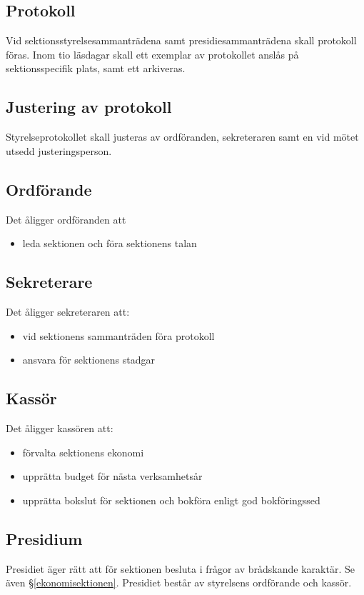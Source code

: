 \documentclass{datateknologsektionen-document}
\begin{document}
    \subsection{Protokoll}
      Vid sektionsstyrelsesammanträdena samt presidiesammanträdena skall protokoll föras.
      Inom tio läsdagar skall ett exemplar av protokollet anslås på sektionsspecifik plats, samt
      ett arkiveras.
    \subsection{Justering av protokoll}
      Styrelseprotokollet skall justeras av ordföranden, sekreteraren samt en vid mötet utsedd
      justeringsperson.
    \subsection{Ordförande}
      Det åligger ordföranden att
      \begin{itemize}
        \item leda sektionen och föra sektionens talan
      \end{itemize}
      
    \subsection{Sekreterare}
      Det åligger sekreteraren att:
      \begin{itemize}
        \item vid sektionens sammanträden föra protokoll
        \item ansvara för sektionens stadgar
      \end{itemize}
     
    \subsection{Kassör}
      Det åligger kassören att:
      \begin{itemize}
        \item förvalta sektionens ekonomi
        \item upprätta budget för nästa verksamhetsår
        \item upprätta bokslut för sektionen och bokföra enligt god bokföringssed
      \end{itemize}
    \subsection{Presidium}
      Presidiet äger rätt att för sektionen besluta i frågor av brådskande karaktär. Se även
      \S \ref{ekonomisektionen}. Presidiet består av styrelsens ordförande och kassör.
\end{document}
